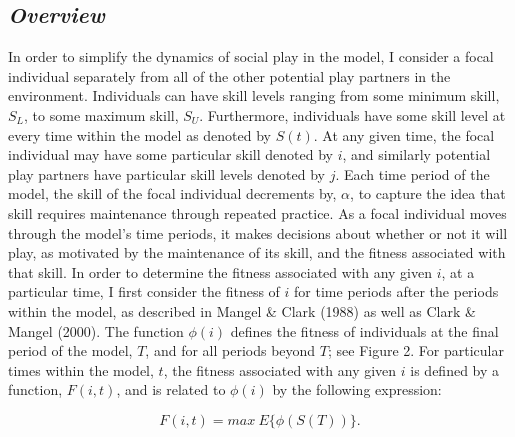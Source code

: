 \documentclass[12pt,letterpaper]{article}
\begin{document}
  \subsection{\it Overview }
    \indent In order to simplify the dynamics of social play in the model, I consider a focal individual separately from all of the other potential play partners in the environment. %
    Individuals can have skill levels ranging from some minimum skill, $S_L$, to some maximum skill, $S_U$. 
    Furthermore, individuals have some skill level at every time within the model as denoted by $S(t)$.
    At any given time, the focal individual may have some particular skill denoted by $i$, and similarly potential play partners have particular skill levels denoted by $j$. %
    Each time period of the model, the skill of the focal individual decrements by, $\alpha$, to capture the idea that skill requires maintenance through repeated practice. %
    As a focal individual moves through the model's time periods, it makes decisions about whether or not it will play, as motivated by the maintenance of its skill, and the fitness associated with that skill. 
    In order to determine the fitness associated with any given $i$, at a particular time, I first consider the fitness of $i$ for time periods after the periods within the model, as described in Mangel \& Clark (1988) as well as Clark \& Mangel (2000).
    The function $\phi(i)$ defines the fitness of individuals at the final period of the model, $T$, and for all periods beyond $T$; see Figure 2.
    For particular times within the model, $t$, the fitness associated with any given $i$ is defined by a function, $F(i,t)$, and is related to $\phi(i)$ by the following expression:
    
    \begin{equation}
    F(i,t)=max~E\{\phi(S(T))\}.
    \label{first}
    \end{equation}
    
\end{document}
